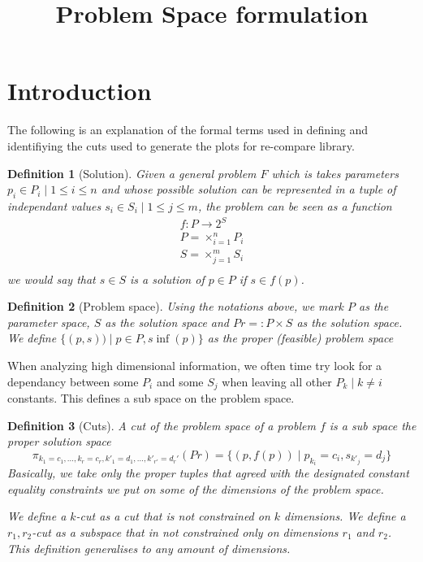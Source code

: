 \documentclass{article}
\numberwithin{theorem}{subsection}
\newtheorem*{definition}{Definition}
\theoremstyle{remark}
\newcommand{\eqdef}{=\mathrel{\mathop:}}
\begin{document}
\title{Problem Space formulation}
\date{\vspace{-5ex}}
\maketitle

\section{Introduction}

The following is an explanation of the formal terms used in defining
and identifiying the cuts used to generate the plots for re-compare library.

\begin{definition}[Solution]
	Given a general problem $F$ which is takes parameters $p_{i}\in P_{i}\mid1\le i\le n$
	and whose possible solution can be represented in a tuple of independant
	values $s_{i}\in S_{i}\mid1\le j\le m$, the problem can be seen as
	a function
	\[\begin{array}{l}
	f:P\rightarrow 2^{S} \\
	P=\times_{i=1}^nP_i\\
	S=\times_{j=1}^mS_i \\
	\end{array}
	\]
	we would say that $s\in S$ is a solution of $p\in P$ if $s\in f(p)$.
\end{definition}

\begin{definition}[Problem space]
	Using the notations above, we mark $ P $ as the parameter space, $ S $ as the solution space and $ Pr \eqdef P \times S  $ as the solution space. We define $ \{ (p,s)) \mid p\in P, s\inf(p) \} $ as the proper (feasible) problem space
\end{definition}

When analyzing high dimensional information, we often time try look for a dependancy between some $ P_i $ and some $ S_j $ when leaving all other $ P_k \mid k\ne i $ constants. This defines a sub space on the problem space.

\begin{definition}[Cuts]
	A cut of the problem space of a problem $ f $ is a sub space the proper solution space
	\[ \pi_{k_1=c_1,\dots,k_r=c_r,k'_1=d_1,\dots,k'_{r'}=d_r' }(Pr) = \{ (p,f(p)) \mid p_{k_i}=c_i, s_{k'_j}=d_j \} \]
	Basically, we take only the proper tuples that agreed with the designated constant equality constraints we put on some of the dimensions of the problem space.

	We define a $ k $-cut as a cut that is not constrained on $ k $ dimensions. We define a $ r_1,r_2 $-cut as a subspace that in not constrained only on dimensions $ r_1 $ and $ r_2 $. This definition generalises to any amount of dimensions.
\end{definition}
\end{document}

